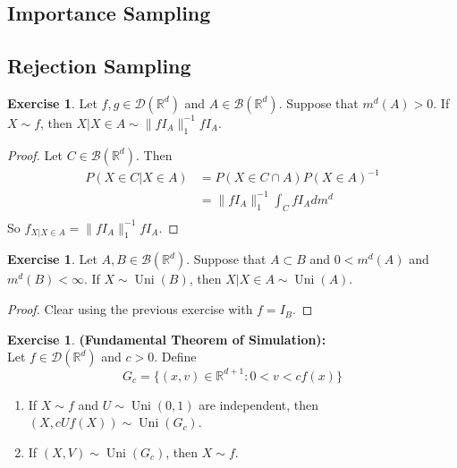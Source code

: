 \documentclass[12pt]{amsart}
\theoremstyle{definition}
\theoremstyle{remark}
\theoremstyle{definition}
\newtheorem{ex}[definition]{Exercise}
\newcommand{\R}{\mathbb{R}}
\newcommand{\MB}{\mathcal{B}}
\newcommand{\MD}{\mathcal{D}}
\DeclareMathOperator{\uni}{Uni}
\begin{document}
	\subsection{Importance Sampling}
	
	\subsection{Rejection Sampling}
	
	\begin{ex}
		Let $f, g \in \MD(\R^d)$ and $A \in \MB(\R^d)$. Suppose that $m^d(A) > 0$. If $X \sim f$, then $X|X \in A \sim \|fI_A\|_1^{-1}fI_A$. 
	\end{ex}

	\begin{proof}
		Let $C \in \MB(\R^d)$. Then
		\begin{align*}
			P(X \in C|X \in A)
			&= P(X \in C \cap A) P(X \in A)^{-1} \\
			&= \|fI_A\|_1^{-1} \int_C fI_A dm^d \\
		\end{align*}
		So $f_{X|X \in A} = \|fI_A\|_1^{-1}fI_A$.
	\end{proof}
	
	\begin{ex}
		Let $A, B \in \MB(\R^d)$. Suppose that $A \subset B$ and $0 < m^d(A)$ and $ m^{d}(B) < \infty$. If $X \sim \uni(B)$, then $X|X \in A \sim \uni(A)$. 
	\end{ex}

	\begin{proof}
		Clear using the previous exercise with $f = I_B$.
	\end{proof}
	
	\begin{ex}\textbf{(Fundamental Theorem of Simulation):} \\
		Let $f \in \MD(\R^d)$ and $c > 0$. Define $$G_c = \{(x,v) \in \R^{d+1}: 0< v < cf(x)\}$$ 
		\begin{enumerate}
			\item If $X \sim f$ and $U \sim \uni(0,1)$  are independent, then $(X, cUf(X)) \sim \uni(G_c)$.
			\item If $(X, V) \sim \uni(G_c)$, then $X \sim f$.
		\end{enumerate}
	\end{ex}
\end{document}
